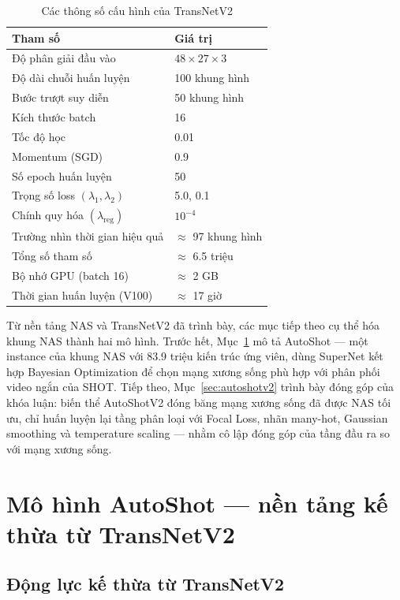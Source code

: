 \begin{table}[H]
\centering
\caption{Các thông số cấu hình của TransNetV2}
\label{tab:transnetv2_params}
\begin{tabularx}{\textwidth}{lY}
\toprule
\textbf{Tham số} & \textbf{Giá trị} \\
\midrule
Độ phân giải đầu vào & $48 \times 27 \times 3$ \\
Độ dài chuỗi huấn luyện & 100 khung hình \\
Bước trượt suy diễn & 50 khung hình \\
Kích thước batch & 16 \\
Tốc độ học & 0.01 \\
Momentum (SGD) & 0.9 \\
Số epoch huấn luyện & 50 \\
Trọng số loss $(\lambda_1, \lambda_2)$ & 5.0, 0.1 \\
Chính quy hóa $(\lambda_{\mathrm{reg}})$ & $10^{-4}$ \\
Trường nhìn thời gian hiệu quả & $\approx$ 97 khung hình \\
Tổng số tham số & $\approx$ 6.5 triệu \\
Bộ nhớ GPU (batch 16) & $\approx$ 2 GB \\
Thời gian huấn luyện (V100) & $\approx$ 17 giờ \\
\bottomrule
\end{tabularx}
\end{table}

\noindent
Từ nền tảng NAS và TransNetV2 đã trình bày, các mục tiếp theo cụ thể hóa khung NAS thành hai mô hình. Trước hết, Mục~\ref{sec:autoshot} mô tả AutoShot --- một instance của khung NAS với 83.9 triệu kiến trúc ứng viên, dùng SuperNet kết hợp Bayesian Optimization để chọn mạng xương sống phù hợp với phân phối video ngắn của SHOT. Tiếp theo, Mục~\ref{sec:autoshotv2} trình bày đóng góp của khóa luận: biến thể AutoShotV2 đóng băng mạng xương sống đã được NAS tối ưu, chỉ huấn luyện lại tầng phân loại với Focal Loss, nhãn many-hot, Gaussian smoothing và temperature scaling --- nhằm cô lập đóng góp của tầng đầu ra so với mạng xương sống.

\section{Mô hình AutoShot — nền tảng kế thừa từ TransNetV2}
\label{sec:autoshot}

\subsection{Động lực kế thừa từ TransNetV2}
\label{subsec:autoshot_motivation}

